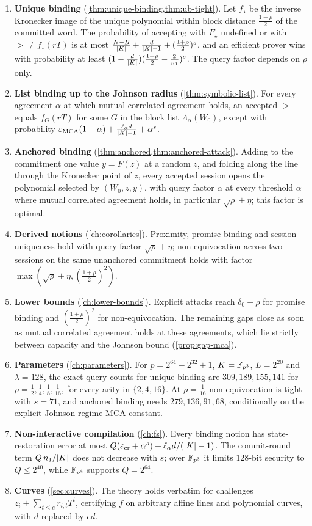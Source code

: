 \begin{enumerate}[label=\textup{(\arabic*)}]
\item \textbf{Unique binding} (\cref{thm:unique-binding,thm:ub-tight}). Let $f_\star$ be the
inverse Kronecker image of the unique polynomial within block distance $\frac{1-\rho}2$ of
the committed word. The probability of accepting with $F_\star$ undefined or with
$\gt\ne f_\star(rT)$ is at most $\frac{N-B}{|K|}+\frac d{|K|-1}+(\frac{1+\rho}2)^s$, and an
efficient prover wins with probability at least
$(1-\frac d{|K|})(\frac{1+\rho}2-\frac2{n_1})^s$. The query factor depends on $\rho$ only.
\item \textbf{List binding up to the Johnson radius} (\cref{thm:symbolic-list}). For every
agreement $\alpha$ at which mutual correlated agreement holds, an accepted $\gt$ equals
$f_G(rT)$ for some $G$ in the block list $\Lambda_\alpha(W_0)$, except with probability
$\varepsilon_{\mathrm{MCA}}(1-\alpha)+\frac{\ell_\alpha d}{|K|-1}+\alpha^s$.
\item \textbf{Anchored binding} (\cref{thm:anchored,thm:anchored-attack}). Adding to the
commitment one value $y=F(z)$ at a random $z$, and folding along the line through the
Kronecker point of $z$, every accepted session opens the polynomial selected by $(W_0,z,y)$,
with query factor $\alpha$ at every threshold $\alpha$ where mutual correlated agreement
holds, in particular $\sqrt\rho+\eta$; this factor is optimal.
\item \textbf{Derived notions} (\cref{ch:corollaries}). Proximity, promise binding and session
uniqueness hold with query factor $\sqrt\rho+\eta$; non-equivocation across two
sessions on the same unanchored commitment holds with factor
$\max(\sqrt\rho+\eta,(\frac{1+\rho}2)^2)$.
\item \textbf{Lower bounds} (\cref{ch:lower-bounds}). Explicit attacks reach
$\delta_0+\rho$ for promise binding and $(\frac{1+\rho}2)^2$ for non-equivocation. The
remaining gaps close as soon as mutual correlated agreement holds at these agreements,
which lie strictly between capacity and the Johnson bound (\cref{prop:gap-mca}).
\item \textbf{Parameters} (\cref{ch:parameters}). For $p=2^{64}-2^{32}+1$, $K=\mathbb{F}_{p^3}$,
$L=2^{20}$ and $\lambda=128$, the exact query counts for unique binding are $309,189,155,141$
for $\rho=\frac12,\frac14,\frac18,\frac1{16}$, for every arity in $\{2,4,16\}$. At
$\rho=\frac1{16}$ non-equivocation is tight with $s=71$, and anchored binding needs
$279,136,91,68$, conditionally on the explicit Johnson-regime MCA constant.
\item \textbf{Non-interactive compilation} (\cref{ch:fs}). Every binding notion has
state-restoration error at most $Q(\varepsilon_{\mathrm{cr}}+\alpha^s)+\ell_\alpha d/(|K|-1)$. The
commit-round term $Q\,n_1/|K|$ does not decrease with $s$; over $\mathbb{F}_{p^3}$ it limits $128$-bit
security to $Q\le2^{40}$, while $\mathbb{F}_{p^4}$ supports $Q=2^{64}$.
\item \textbf{Curves} (\cref{sec:curves}). The theory holds verbatim for challenges
$z_i+\sum_{t\le e}r_{i,t}T^t$, certifying $f$ on arbitrary affine lines and polynomial
curves, with $d$ replaced by $ed$.
\end{enumerate}

